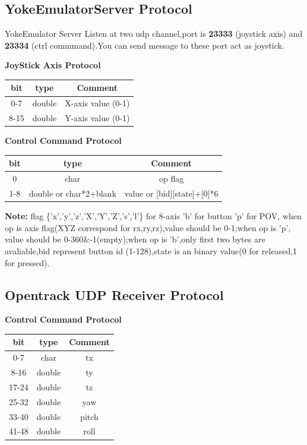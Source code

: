 \documentclass[12pt,a4paper]{article}
\begin{document}
\begin{CJK}{UTF8}{gbsn}
\subsection{YokeEmulatorServer Protocol}
YokeEmulator Server Listen at two udp channel,port is \textbf{23333} (joystick axis) and \textbf{23334} (ctrl commmand).You can send message to these port act as joystick.\\
\begin{center}
\textbf{JoyStick Axis Protocol}\\
\begin{tabular}{c|c|c}
\hline \textbf{bit} & \textbf{type} & \textbf{Comment} \\
\hline 0-7 & double & X-axis value (0-1) \\
\hline 8-15 & double & Y-axis value (0-1) \\
\hline
\end{tabular}
\end{center}

\begin{center}
\textbf{Control Command Protocol} \\
\begin{tabular}{c|c|c}
\hline \textbf{bit} & \textbf{type} & \textbf{Comment} \\
\hline 0 & char & op flag\\
\hline 1-8 & double or char*2+blank & value or [bid][state]+[0]*6 \\
\hline
\end{tabular}
\end{center}

\textbf{Note:} flag \{'x','y','z','X','Y','Z','s','l'\} for 8-axis 'b' for button 'p' for POV, when op is axis flag(XYZ correspond for rx,ry,rz),value should be 0-1;when op is 'p', value should be 0-360\&-1(empty);when op is 'b',only first two bytes are avaliable,bid represent button id (1-128),state is an binary value(0 for released,1 for pressed). \\
\subsection{Opentrack UDP Receiver Protocol}
\begin{center}
\textbf{Control Command Protocol} \\
\begin{tabular}{c|c|c}
\hline \textbf{bit} & \textbf{type} & \textbf{Comment} \\
\hline 0-7 & char & tx\\
\hline 8-16 & double & ty \\
\hline 17-24 & double & tz \\
\hline 25-32 & double & yaw \\
\hline 33-40 & double & pitch \\
\hline 41-48 & double & roll \\
\hline
\end{tabular}\end{center}

\end{CJK}
\end{document}
